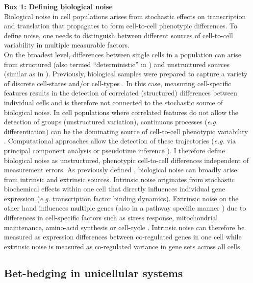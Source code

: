\begin{Comment}
\textbf{Box 1: Defining biological noise}\\
Biological noise in cell populations arises from stochastic effects on transcription and translation that propagates to form cell-to-cell phenotypic differences. To define noise, one needs to distinguish between different sources of cell-to-cell variability in multiple measurable factors. \\
On the broadest level, differences between single cells in a population can arise from structured (also termed “deterministic” in \citep{Marusyk2012}) and unstructured sources (similar as in \citep{Singer2014a}). Previously, biological samples were prepared to capture a variety of discrete cell-states and/or cell-types \todo{[refs]}.  In this case, measuring cell-specific features results in the detection of correlated (structured) differences between individual cells and is therefore not connected to the stochastic source of biological noise. In cell populations where correlated features do not allow the detection of groups (unstructured variation), continuous processes (\emph{e.g.} differentiation) can be the dominating source of cell-to-cell phenotypic variability \todo{[refs]}. Computational approaches allow the detection of these trajectories (\emph{e.g.} via principal component analysis or pseudotime inference \citep{Trapnell2014, Angerer2015}). I therefore define biological noise as unstructured, phenotypic cell-to-cell differences independent of measurement errors. 
As previously defined \citep{Elowitz2002}, biological noise can broadly arise from intrinsic and extrinsic sources. Intrinsic noise originates from stochastic biochemical effects within one cell that directly influences individual gene expression \citep{Swain2002} (\emph{e.g.} transcription factor binding dynamics). Extrinsic noise on the other hand influences multiple genes (also in a pathway specific manner \citep{Raser2010}) due to differences in cell-specific factors such as stress response, mitochondrial maintenance, amino-acid synthesis \citep{Stewart-Ornstein2012} or cell-cycle \citep{Zopf2013}. Intrinsic noise can therefore be measured as expression differences between co-regulated genes in one cell while extrinsic noise is measured as co-regulated variance in gene sets across all cells.\\
\end{Comment}

\subsection{Bet-hedging in unicellular systems}


